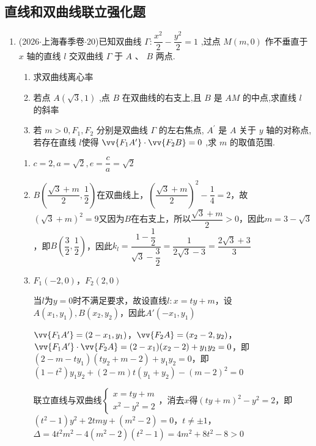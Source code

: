 \subsection*{直线和双曲线联立强化题}
\begin{enumerate}
    \item (2026$\cdot$上海春季卷$\cdot$20)已知双曲线 $\Gamma  : \dfrac{{x}^{2}}{2} - \dfrac{{y}^{2}}{2} = 1$ ,过点 $M\left( {m,0}\right)$ 作不垂直于 $x$ 轴的直线 $l$ 交双曲线 $\Gamma$ 于 $A$ 、 $B$ 两点.
    \begin{enumerate}
        \item 求双曲线离心率
        \item 若点 $A\left( {\sqrt{3},1}\right)$ ,点 $B$ 在双曲线的右支上,且 $B$ 是 ${AM}$ 的中点,求直线 $l$ 的斜率
        \item 若 $m > 0,{F}_{1},{F}_{2}$ 分别是双曲线 $\Gamma$ 的左右焦点, ${A}^{\prime }$ 是 $A$ 关于 $y$ 轴的对称点,若存在直线 $l$使得 $\vv{{F}_{1}{A}^{\prime }} \cdot  \vv{{F}_{2}B} = 0$ ,求 $m$ 的取值范围.
    \end{enumerate}
    \begin{jieda}
        \begin{enumerate}
            \item $c = 2, a = \sqrt{2}, e = \dfrac{c}{a} = \sqrt{2}$
            \item $B\left(\dfrac{\sqrt{3}+m}{2}, \dfrac{1}{2}\right)$在双曲线上，$\left(\dfrac{\sqrt{3}+m}{2}\right)^2 - \dfrac{1}{4} = 2$，故$(\sqrt{3}+m)^2 =9$又因为$B$在右支上，所以$\dfrac{\sqrt{3}+m}{2} > 0$，因此$m = 3-\sqrt{3}$，即$B\left(\dfrac{3}{2}, \dfrac{1}{2}\right)$，因此$k_l = \dfrac{1-\dfrac{1}{2}}{\sqrt{3}-\dfrac{3}{2}} = \dfrac{1}{2\sqrt{3}-3} = \dfrac{2\sqrt{3}+3}{3}$
            \item $F_1(-2, 0)$，$F_2(2, 0)$
            
            当$l$为$y = 0$时不满足要求，故设直线$l:  x = ty + m$，设$A(x_1, y_1), B(x_2, y_2)$，因此$A'(-x_1, y_1)$

            $\vv{F_1A'} = (2-x_1, y_1)$，$\vv{F_2A} = (x_2-2, y_2)$，$\vv{F_1A'} \cdot \vv{F_2A} =(2-x_1)(x_2-2)+y_1y_2 = 0$，即$(2-m-ty_1)(ty_2+m-2)+y_1y_2 = 0$，即$(1-t^2)y_1y_2+(2-m)t(y_1+y_2)-(m-2)^2 = 0$

            联立直线与双曲线$\left\{\begin{array}{l}
                 x = ty+m  \\
                 x^2-y^2 = 2
            \end{array}\right.$，消去$x$得$(ty+m)^2-y^2 = 2$，即$(t^2-1)y^2+2tmy+(m^2-2) = 0$，$t \neq \pm 1$，$\Delta = 4t^2m^2 - 4(m^2-2)(t^2-1) = 4m^2+8t^2-8 > 0$


\end{enumerate}
\end{jieda}
\end{enumerate}
